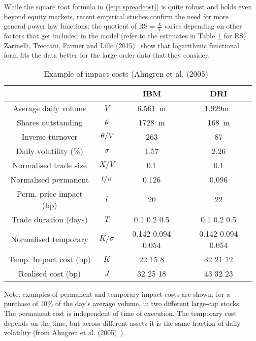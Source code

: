 While the square root formula in (\ref{eqn:spreadcost}) is quite robust and holds even beyond equity markets, recent empirical studies confirm the need for more general power law functions; the quotient of $\text{RS}=\frac{X}{V}$ varies depending on other factors that get included in the model (refer to the estimates in Table~\ref{tab:costimpact} for RS). Zarinelli, Treccani, Farmer and Lillo (2015)~\cite{zar} show that logarithmic functional form fits the data better for the large order data that they consider. 


\begin{table}[!ht]
\caption{Example of impact costs (Almgren et al. (2005)~\cite{athl} \label{tab:costimpact}}
\begin{tabular}{cccc}
 & & IBM & DRI \\ \hline
Average daily volume & $V$ & 6.561~m & 1.929m~ \\
Shares outstanding & $\theta$ & 1728~m & 168~m \\
Inverse turnover & $\theta/V$ & 263 & 87 \\
Daily volatility (\%) & $\sigma$ &1.57 & 2.26 \\
Normalised trade size & $X/V$ & 0.1 & 0.1 \\ \hline
Normalised permanent & $l/\sigma$ & 0.126 & 0.096 \\
Perm. price impact (bp) & $l$ & 20 & 22 \\ \hline
Trade duration (days) & $T$ & 0.1 \hspace{0.2cm} 0.2 \hspace{0.2cm} 0.5 & 0.1 \hspace{0.2cm}0.2 \hspace{0.2cm} 0.5\\
Normalised temporary & $K/\sigma$ & 0.142 \hspace{0.2cm} 0.094 \hspace{0.2cm}0.054 & 0.142 \hspace{0.2cm} 0.094 \hspace{0.2cm} 0.054 \\
Temp. Impact cost (bp) & $K$ & 22 \hspace{0.2cm} 15 \hspace{0.2cm} 8 & 32  \hspace{0.2cm}21\hspace{0.2cm} 12 \\ \hline
Realised cost (bp) & $J$ & 32 \hspace{0.2cm} 25 \hspace{0.2cm} 18 & 43 \hspace{0.2cm}32 \hspace{0.2cm} 23
\end{tabular}
\small Note: examples of permanent and temporary impact costs are shown, for a purchase of 10\% of the day's average volume, in two different large-cap stocks. The permanent cost is independent of time of execution. The temporary cost depends on the time, but across different assets it is the same fraction of daily volatility (from Almgren et al. (2005)~\cite{athl}). \normalsize
\end{table}


